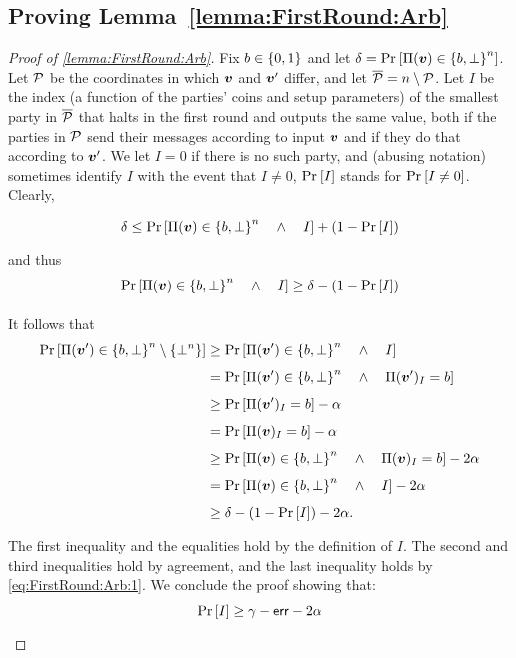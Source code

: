 	
\newcommand{\PPf}{\Pi^\cP}	
\subsection{Proving Lemma~\ref{lemma:FirstRound:Arb}}
\begin{proof}[Proof of \cref{lemma:FirstRound:Arb}]
Fix $b \in \{0,1\}$ and let $\delta = \Pr_{}\left[\Pi({ \boldsymbol{v}}) \in \left\{b,\bot\right\}^n\right]$. Let $\mathcal{P}$ be the coordinates in which ${ \boldsymbol{v}}$ and ${ \boldsymbol{v}}'$ differ, and let ${\overline{\mathcal{P}}} = n \setminus \mathcal{P}$. Let $I$ be the index (a function of the parties' coins and setup parameters) of the smallest party in ${\overline{\mathcal{P}}}$ that halts in the first round and outputs the same value, both if the parties in $\mathcal{P}$ send their messages according to input ${ \boldsymbol{v}}$ and if they do that according to ${ \boldsymbol{v}}'$. We let $I=0$ if there is no such party, and (abusing notation) sometimes identify $I$ with the event that $I\neq 0$, \eg $\Pr_{}\left[I\right]$ stands for $\Pr_{}\left[I\ne 0\right]$. Clearly,



\begin{align*}
\delta \le \Pr_{}\left[\Pi({ \boldsymbol{v}}) \in \left\{b,\bot\right\}^n \quad \land \quad I\right]+ (1- \Pr_{}\left[I\right])
\end{align*}
and thus
\begin{align}\label{eq:FirstRound:Arb:1}
\Pr_{}\left[\Pi({ \boldsymbol{v}}) \in \left\{b,\bot\right\}^n \quad \land \quad I\right] \ge \delta - (1-\Pr_{}\left[I\right])
\end{align}
	
It follows that
\begin{align}\label{eq:FirstRound:Arb:2}
\Pr_{}\left[\Pi({ \boldsymbol{v}}') \in \left\{b,\bot\right\}^n \setminus \left\{\bot^n\right\}\right] &\ge \Pr_{}\left[\Pi({ \boldsymbol{v}}') \in \left\{b,\bot\right\}^n \quad \land \quad I\right]\\
&=\Pr_{}\left[\Pi({ \boldsymbol{v}}') \in \left\{b,\bot\right\}^n \quad \land \quad \Pi({ \boldsymbol{v}}')_I= b\right]\nonumber\\
&\ge \Pr_{}\left[\Pi({ \boldsymbol{v}}')_I= b\right] - \alpha\nonumber\\
&= \Pr_{}\left[\Pi({ \boldsymbol{v}})_I = b\right] - \alpha\nonumber\\
&\ge \Pr_{}\left[\Pi({ \boldsymbol{v}}) \in \left\{b,\bot\right\}^n \quad \land \quad \Pi({ \boldsymbol{v}})_I = b\right] - 2\alpha\nonumber\\
&= \Pr_{}\left[\Pi({ \boldsymbol{v}}) \in \left\{b,\bot\right\}^n \quad \land \quad I\right] - 2\alpha\nonumber\\
&\ge \delta - (1-\Pr_{}\left[I\right]) - 2\alpha.\nonumber
\end{align}
The first inequality and the equalities hold by the definition of $I$. The second and third inequalities hold by agreement, and the last inequality holds by \cref{eq:FirstRound:Arb:1}. We conclude the proof showing that:
\begin{align}\label{claim:FirstRound:Arb}
	\Pr_{}\left[I\right] \ge \gamma - \mathsf{err} - 2\alpha
\end{align}


\end{proof}
